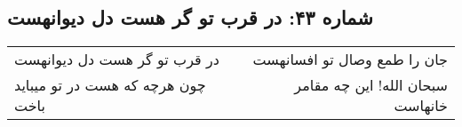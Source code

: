 \begin{center}
\section*{شماره ۴۳: در قرب تو گر هست دل دیوانهست}
\label{sec:043}
\begin{longtable}{l p{0.5cm} r}
در قرب تو گر هست دل دیوانهست
&&
جان را طمع وصال تو افسانهست
\\
چون هرچه که هست در تو میباید باخت
&&
سبحان الله! این چه مقامر خانهاست
\\
\end{longtable}
\end{center}
